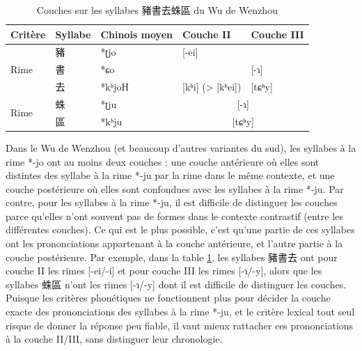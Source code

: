 \documentclass{scrbook}
\newcounter{c}[subsubsection]
\begin{document}
\begin{sloppypar}
\begin{table}[htbp]
  \centering
    \begin{tabular}{lllcc}
    \toprule
    Critère & Syllabe & Chinois moyen  & \multicolumn{1}{l}{Couche II} & \multicolumn{1}{l}{Couche III} \\
    \midrule
    \multirow{3}[2]{*}{Rime} & 豬     & *ʈjo  & \multicolumn{1}{l}{[-ei]} &  \\
          & 書     & *ɕo   &       & \multicolumn{1}{l}{[-ɿ]} \\
          & 去     & *kʰjoH & \multicolumn{1}{l}{[kʰi] (> [kʰei])} & \multicolumn{1}{l}{[tɕʰy]} \\
    \midrule
    \multirow{2}[2]{*}{Rime} & 蛛     & *ʈju  & \multicolumn{2}{c}{\cellcolor[rgb]{ .851,  .851,  .851}[-ɿ]} \\
          & 區     & *kʰju & \multicolumn{2}{c}{\cellcolor[rgb]{ .851,  .851,  .851}[tɕʰy]} \\
    \bottomrule
    \end{tabular}%
  \caption{Couches sur les syllabes 豬書去蛛區 du Wu de Wenzhou}
  \label{tab:exemple_ambigu_wenzhou}%
\end{table}%

Dans le Wu de Wenzhou (et beaucoup d'autres variantes du sud), les syllabes à la rime *-jo ont au moins deux couches : une couche antérieure où elles sont distintes des syllabe à la rime *-ju par la rime dans le même contexte, et une couche postérieure où elles sont confondues avec les syllabes à la rime *-ju. Par contre, pour les syllabes à la rime *-ju, il est difficile de distinguer les couches parce qu'elles n'ont souvent pas de formes dans le contexte contrastif (entre les différentes couches). Ce qui est le plus possible, c'est qu'une partie de ces syllabes ont les prononciations appartenant à la couche antérieure, et l'autre partie à la couche postérieure. Par exemple, dans la table \ref{tab:exemple_ambigu_wenzhou}, les syllabes 豬書去 ont pour couche II les rimes [-ei/-i] et pour couche III les rimes [-ɿ/-y], alors que les syllabes 蛛區 n'ont les rimes [-ɿ/-y] dont il est difficile de distinguer les couches. Puisque les critères phonétiques ne fonctionnent plus pour décider la couche exacte des prononciations des syllabes à la rime *-ju, et le critère lexical tout seul risque de donner la réponse peu fiable, il vaut mieux rattacher ces prononciations à la couche II/III, sans distinguer leur chronologie.


\end{sloppypar}
\end{document}
